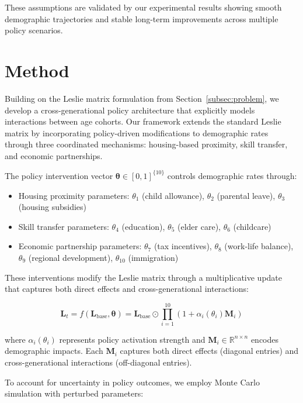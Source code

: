 \documentclass{article} %
\begin{document}
These assumptions are validated by our experimental results showing smooth demographic trajectories and stable long-term improvements across multiple policy scenarios.

\section{Method}
\label{sec:method}

Building on the Leslie matrix formulation from Section~\ref{subsec:problem}, we develop a cross-generational policy architecture that explicitly models interactions between age cohorts. Our framework extends the standard Leslie matrix by incorporating policy-driven modifications to demographic rates through three coordinated mechanisms: housing-based proximity, skill transfer, and economic partnerships.

The policy intervention vector $\boldsymbol{\theta} \in [0,1]^{\{10\}}$ controls demographic rates through:
\begin{itemize}
    \item Housing proximity parameters: $\theta_1$ (child allowance), $\theta_2$ (parental leave), $\theta_3$ (housing subsidies)
    \item Skill transfer parameters: $\theta_4$ (education), $\theta_5$ (elder care), $\theta_6$ (childcare)
    \item Economic partnership parameters: $\theta_7$ (tax incentives), $\theta_8$ (work-life balance), $\theta_9$ (regional development), $\theta_{10}$ (immigration)
\end{itemize}

These interventions modify the Leslie matrix through a multiplicative update that captures both direct effects and cross-generational interactions:

\begin{equation}
\mathbf{L}_t = f(\mathbf{L}_{\text{base}}, \boldsymbol{\theta}) = \mathbf{L}_{\text{base}} \odot \prod_{i=1}^{10} (1 + \alpha_i(\theta_i)\mathbf{M}_i)
\end{equation}

where $\alpha_i(\theta_i)$ represents policy activation strength and $\mathbf{M}_i \in \mathbb{R}^{n \times n}$ encodes demographic impacts. Each $\mathbf{M}_i$ captures both direct effects (diagonal entries) and cross-generational interactions (off-diagonal entries).

To account for uncertainty in policy outcomes, we employ Monte Carlo simulation with perturbed parameters:
\end{document}
